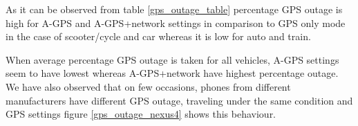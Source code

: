 \documentclass[12pt]{report}
\begin{document}
 As it can be observed from table \ref{gps_outage_table} percentage GPS outage
 is high for A-GPS and A-GPS+network settings in comparison to GPS
 only mode in the case of scooter/cycle and car whereas it is low for auto and
 train.

 When average percentage GPS outage is taken for all vehicles, A-GPS settings
 seem to have lowest whereas A-GPS+network have highest percentage outage. We
 have also observed that on few occasions, phones from different manufacturers
 have different GPS outage, traveling under the same condition and GPS settings
 figure \ref{gps_outage_nexus4} shows this behaviour.

 




 \newpage
\end{document}
